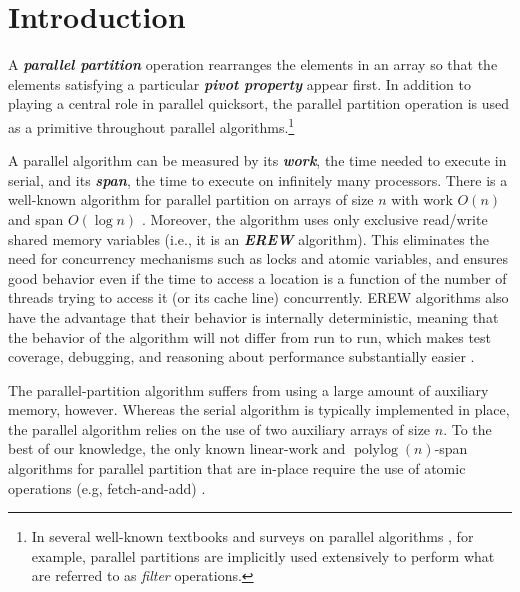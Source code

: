 \documentclass[sigconf]{acmart}
\newcommand{\defn}[1]       {{\textit{\textbf{\boldmath #1}}}}
\theoremstyle{remark}
\theoremstyle{remark}
\begin{document}
\maketitle





 

\section{Introduction}

A \defn{parallel partition} operation rearranges the elements in an
array so that the elements satisfying a particular \defn{pivot
  property} appear first. In addition to playing a central role in
parallel quicksort, the parallel partition operation is used as a
primitive throughout parallel algorithms.\footnote{In several
  well-known textbooks and surveys on parallel algorithms
  \cite{AcarBl16,Blelloch96}, for example, parallel partitions are
  implicitly used extensively to perform what are referred to as
  \emph{filter} operations.}

A parallel algorithm can be measured by its \defn{work}, the time
needed to execute in serial, and its \defn{span}, the time to execute
on infinitely many processors. There is a well-known algorithm for
parallel partition on arrays of size $n$ with work $O(n)$ and span
$O(\log n)$ \cite{Blelloch96,AcarBl16}. Moreover, the algorithm uses
only exclusive read/write shared memory variables (i.e., it is an
\defn{EREW} algorithm). This eliminates the need for concurrency
mechanisms such as locks and atomic variables, and ensures good
behavior even if the time to access a location is a function of the
number of threads trying to access it (or its cache line)
concurrently. EREW algorithms also have the advantage that their
behavior is internally deterministic, meaning that
the behavior of the algorithm will not differ from run to run, which
makes test coverage, debugging, and reasoning about performance
substantially easier \cite{BlellochFi12}.

The parallel-partition algorithm suffers from using a large amount of
auxiliary memory, however. Whereas the serial algorithm is typically
implemented in place, the parallel algorithm relies on the use of two
auxiliary arrays of size $n$. To the best of our knowledge, the only
known linear-work and $\operatorname{polylog}(n)$-span algorithms for
parallel partition that are in-place require the use of atomic
operations (e.g, fetch-and-add)
\cite{HeidelbergerNo90,AxtmannWi17,TsigasZh03}.
\end{document}
